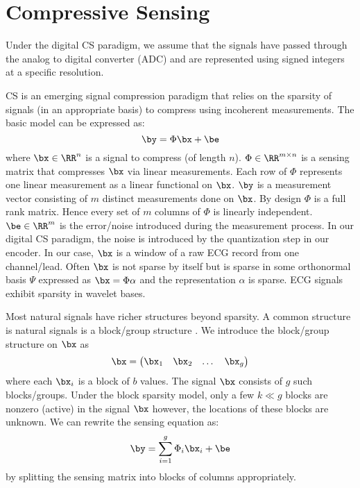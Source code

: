 \section{Compressive Sensing}
\label{appsec:cs}
Under the digital CS paradigm, we assume that the
signals have passed through the analog to digital
converter (ADC) and are represented using signed integers
at a specific resolution.

CS is an emerging signal compression paradigm that relies
on the sparsity of signals (in an appropriate basis)
to compress using incoherent measurements.
The basic model can be expressed as:
\begin{equation}
\by = \Phi \bx + \be
\end{equation}
where $\bx \in \RR^n$ is a signal to compress
(of length $n$). $\Phi \in \RR^{m \times n}$
is a sensing matrix that compresses $\bx$
via linear measurements. Each row of $\Phi$
represents one linear measurement as a linear
functional on $\bx$. $\by$ is a measurement
vector consisting of $m$ distinct measurements
done on $\bx$. By design $\Phi$ is a full
rank matrix. Hence every set of $m$ columns of $\Phi$
is linearly independent. $\be \in \RR^m$ is the
error/noise introduced during the measurement process.
In our digital CS paradigm, the noise is introduced
by the quantization step in our encoder.
In our case, $\bx$ is a window of a raw ECG record
from one channel/lead. 
Often $\bx$ is not sparse by itself but is sparse
in some orthonormal basis $\Psi$ expressed as
$\bx = \Phi \alpha$ and the representation $\alpha$
is sparse. ECG signals exhibit sparsity in wavelet
bases.

Most natural signals have richer structures beyond
sparsity. A common structure is natural signals
is a block/group structure \cite{eldar2010block}. 
We introduce the block/group structure on $\bx$ as
\begin{equation}
\bx = \begin{pmatrix}
\bx_1 & \bx_2 & \dots & \bx_g
\end{pmatrix}
\end{equation}
where each $\bx_i$ is a block of $b$ values.
The signal $\bx$ consists of $g$ such blocks/groups.
Under the block sparsity model, only a few $k \ll g$
blocks are nonzero (active) in the signal $\bx$
however, the locations of these blocks are unknown.
We can rewrite the sensing equation as:
\begin{equation}
\by = \sum_{i=1}^g \Phi_i \bx_i + \be
\end{equation}
by splitting the sensing matrix into blocks of columns appropriately.

